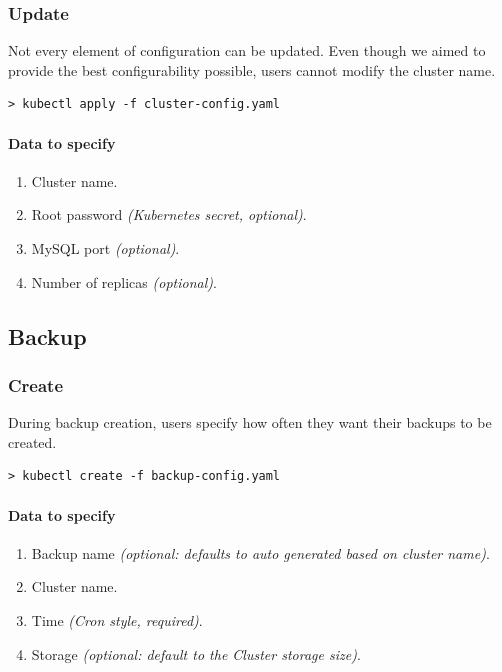 \subsubsection*{Update}

Not every element of configuration can be updated. Even though we aimed 
to provide the best configurability possible, users cannot modify the
cluster name.

\begin{lstlisting}
> kubectl apply -f cluster-config.yaml
\end{lstlisting}

\paragraph{Data to specify}
\begin{enumerate}
	\item Cluster name.
	\item Root password \textit{(Kubernetes secret, optional)}.
	\item MySQL port \textit{(optional)}.
	\item Number of replicas \textit{(optional)}.
\end{enumerate}

\subsection{Backup}
\subsubsection*{Create}

During backup creation, users specify how often they want their backups 
to be created.

\begin{lstlisting}
> kubectl create -f backup-config.yaml
\end{lstlisting}

\paragraph{Data to specify}
\begin{enumerate}
	\item Backup name \textit{(optional: defaults to auto generated based on cluster name)}.
	\item Cluster name.
	\item Time \textit{(Cron style, required)}.
	\item Storage \textit{(optional: default to the Cluster storage size)}.
\end{enumerate}

